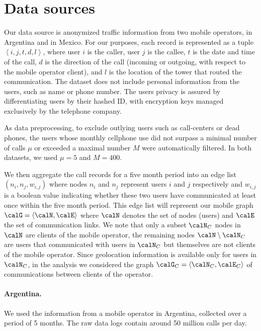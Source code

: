 \section{Data sources}

Our data source is anonymized traffic information from two mobile operators, in Argentina and in Mexico.
For our purposes, each record is represented as a tuple $\left < i, j, t, d, l \right >$,
where user $i$ is the caller, user $j$ is the callee, $t$ is the date and time of the call,
$d$ is the direction of the call (incoming or outgoing, with respect to the mobile operator client), and $l$ is the location of the tower that routed the communication.
The dataset does not include personal information from the users, such as name or phone number. The users privacy is assured by differentiating users by their hashed ID, with encryption keys managed exclusively by the telephone company.

As data preprocessing, to exclude outlying users such as call-centers or dead phones, the users whose monthly cellphone use did not surpass a minimal number of calls $\mu$ or exceeded a maximal number $M$ were automatically filtered. In both datasets, we used $\mu = 5$ and $M = 400$.

We then aggregate the call records for a five 
month period into an edge list $(n_i, n_j, w_{i,j})$ where nodes $n_i$ and $n_j$ 
represent users $i$ and $j$ respectively and $w_{i,j}$ is a boolean value
indicating whether these two users have communicated at least once within the 
five month period. This edge list will represent our mobile graph  
$\calG = \left< \calN, \calE \right> $ where $\calN$ denotes the set of nodes (users) 
and $\calE$ the set of communication links. We note that only a subset $\calN_C$ nodes in $\calN$
are clients of the mobile operator, the remaining nodes $\calN \setminus \calN_C$ are
users that communicated with users in $ \calN_C $ but themselves are not clients of
the mobile operator. 
Since geolocation information is available only for users in $\calN_C$, in the analysis we considered the graph $\calG_C = \left< \calN_C, \calE_C \right> $ of communications between clients of the operator.

\paragraph{Argentina.} We used the information from a mobile operator in Argentina, collected over a period of 5 months. The raw data logs contain around 50 million calls per day.

